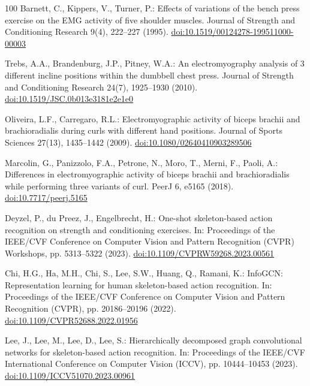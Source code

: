 \documentclass[preprint,12pt]{elsarticle}
\begin{document}
\begin{thebibliography}{100}
Barnett, C., Kippers, V., Turner, P.: Effects of variations of the bench press exercise on the EMG activity of five shoulder muscles. Journal of Strength and Conditioning Research 9(4), 222--227 (1995). \href{https://doi.org/10.1519/00124278-199511000-00003}{doi:10.1519/00124278-199511000-00003}

Trebs, A.A., Brandenburg, J.P., Pitney, W.A.: An electromyography analysis of 3 different incline positions within the dumbbell chest press. Journal of Strength and Conditioning Research 24(7), 1925--1930 (2010). \href{https://doi.org/10.1519/JSC.0b013e3181e2e1e0}{doi:10.1519/JSC.0b013e3181e2e1e0}

Oliveira, L.F., Carregaro, R.L.: Electromyographic activity of biceps brachii and brachioradialis during curls with different hand positions. Journal of Sports Sciences 27(13), 1435--1442 (2009). \href{https://doi.org/10.1080/02640410903289506}{doi:10.1080/02640410903289506}

Marcolin, G., Panizzolo, F.A., Petrone, N., Moro, T., Merni, F., Paoli, A.: Differences in electromyographic activity of biceps brachii and brachioradialis while performing three variants of curl. PeerJ 6, e5165 (2018). \href{https://doi.org/10.7717/peerj.5165}{doi:10.7717/peerj.5165}

Deyzel, P., du Preez, J., Engelbrecht, H.: One-shot skeleton-based action recognition on strength and conditioning exercises. In: Proceedings of the IEEE/CVF Conference on Computer Vision and Pattern Recognition (CVPR) Workshops, pp. 5313--5322 (2023). \href{https://doi.org/10.1109/CVPRW59268.2023.00561}{doi:10.1109/CVPRW59268.2023.00561}

Chi, H.G., Ha, M.H., Chi, S., Lee, S.W., Huang, Q., Ramani, K.: InfoGCN: Representation learning for human skeleton-based action recognition. In: Proceedings of the IEEE/CVF Conference on Computer Vision and Pattern Recognition (CVPR), pp. 20186--20196 (2022). \href{https://doi.org/10.1109/CVPR52688.2022.01956}{doi:10.1109/CVPR52688.2022.01956}

Lee, J., Lee, M., Lee, D., Lee, S.: Hierarchically decomposed graph convolutional networks for skeleton-based action recognition. In: Proceedings of the IEEE/CVF International Conference on Computer Vision (ICCV), pp. 10444--10453 (2023). \href{https://doi.org/10.1109/ICCV51070.2023.00961}{doi:10.1109/ICCV51070.2023.00961}


\end{thebibliography}
\end{document}
